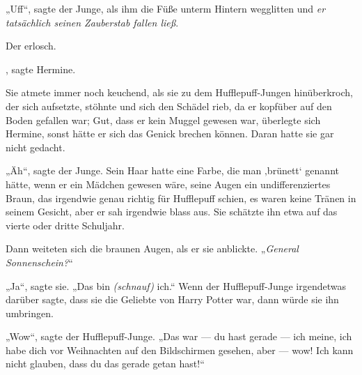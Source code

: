 „Uff“, sagte der Junge, als ihm die Füße unterm Hintern wegglitten und \emph{er tatsächlich seinen Zauberstab fallen ließ}.

Der  erlosch.

, sagte Hermine.

Sie atmete immer noch keuchend, als sie zu dem Hufflepuff-Jungen hinüberkroch, der sich aufsetzte, stöhnte und sich den Schädel rieb, da er kopfüber auf den Boden gefallen war; Gut, dass er kein Muggel gewesen war, überlegte sich Hermine, sonst hätte er sich das Genick brechen können. Daran hatte sie gar nicht gedacht.

„Äh“, sagte der Junge. Sein Haar hatte eine Farbe, die man ‚brünett‘ genannt hätte, wenn er ein Mädchen gewesen wäre, seine Augen ein undifferenziertes Braun, das irgendwie genau richtig für Hufflepuff schien, es waren keine Tränen in seinem Gesicht, aber er sah irgendwie blass aus. Sie schätzte ihn etwa auf das vierte oder dritte Schuljahr.

Dann weiteten sich die braunen Augen, als er sie anblickte.
„\emph{General Sonnenschein?}“

„Ja“, sagte sie.
„Das bin \emph{(schnauf)} ich.“ Wenn der Hufflepuff-Junge irgendetwas darüber sagte, dass sie die Geliebte von Harry Potter war, dann würde sie ihn umbringen.

„Wow“, sagte der Hufflepuff-Junge.
„Das war — du hast gerade — ich meine, ich habe dich vor Weihnachten auf den Bildschirmen gesehen, aber — wow! Ich kann nicht glauben, dass du das gerade getan hast!“

